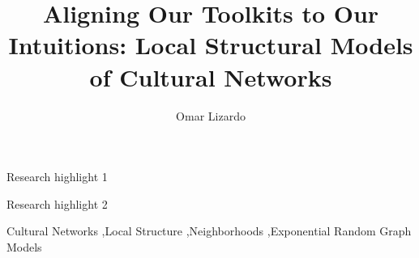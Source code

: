 \documentclass[preprint,12pt,authoryear]{elsarticle}
\begin{document}
\begin{frontmatter}



\title{Aligning Our Toolkits to Our Intuitions: Local Structural Models of Cultural Networks}


\author[inst1]{Omar Lizardo}



\begin{abstract}

\end{abstract}


\begin{highlights}
\item Research highlight 1
\item Research highlight 2
\end{highlights}

\begin{keyword}
Cultural Networks \sep Local Structure \sep Neighborhoods \sep Exponential Random Graph Models
\end{keyword}

\end{frontmatter}
\end{document}
